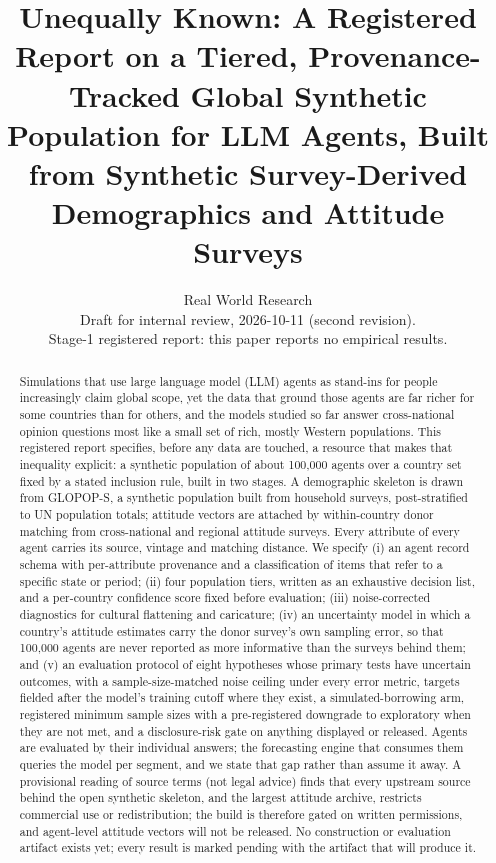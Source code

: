\documentclass[10pt]{article}
\title{Unequally Known: A Registered Report on a Tiered, Provenance-Tracked Global Synthetic Population for LLM Agents, Built from Synthetic Survey-Derived Demographics and Attitude Surveys}
\author{Real World Research\\\small Draft for internal review, 2026-10-11 (second revision).\\\small Stage-1 registered report: this paper reports no empirical results.}
\date{}
\begin{document}
\maketitle

\begin{abstract}
Simulations that use large language model (LLM) agents as stand-ins for people increasingly claim global scope, yet the data that ground those agents are far richer for some countries than for others, and the models studied so far answer cross-national opinion questions most like a small set of rich, mostly Western populations. This registered report specifies, before any data are touched, a resource that makes that inequality explicit: a synthetic population of about 100,000 agents over a country set fixed by a stated inclusion rule, built in two stages. A demographic skeleton is drawn from GLOPOP-S, a synthetic population built from household surveys, post-stratified to UN population totals; attitude vectors are attached by within-country donor matching from cross-national and regional attitude surveys. Every attribute of every agent carries its source, vintage and matching distance. We specify (i) an agent record schema with per-attribute provenance and a classification of items that refer to a specific state or period; (ii) four population tiers, written as an exhaustive decision list, and a per-country confidence score fixed before evaluation; (iii) noise-corrected diagnostics for cultural flattening and caricature; (iv) an uncertainty model in which a country's attitude estimates carry the donor survey's own sampling error, so that 100,000 agents are never reported as more informative than the surveys behind them; and (v) an evaluation protocol of eight hypotheses whose primary tests have uncertain outcomes, with a sample-size-matched noise ceiling under every error metric, targets fielded after the model's training cutoff where they exist, a simulated-borrowing arm, registered minimum sample sizes with a pre-registered downgrade to exploratory when they are not met, and a disclosure-risk gate on anything displayed or released. Agents are evaluated by their individual answers; the forecasting engine that consumes them queries the model per segment, and we state that gap rather than assume it away. A provisional reading of source terms (not legal advice) finds that every upstream source behind the open synthetic skeleton, and the largest attitude archive, restricts commercial use or redistribution; the build is therefore gated on written permissions, and agent-level attitude vectors will not be released. No construction or evaluation artifact exists yet; every result is marked pending with the artifact that will produce it.
\end{abstract}
\end{document}
